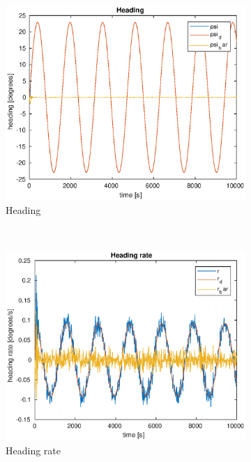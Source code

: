 \begin{figure}[ht]
	\centering
	\begin{subfigure}[b]{0.3\textwidth}
		\includegraphics[width=\textwidth]{heading1_4}
		\caption{Heading}
		\label{fig:heading1_4}
	\end{subfigure}%
	~
	\begin{subfigure}[b]{0.3\textwidth}
		\includegraphics[width=\textwidth]{heading_rate1_4}
		\caption{Heading rate}
		\label{fig:heading_rate1_4}
	\end{subfigure}%
        ~
	\begin{subfigure}[b]{0.3\textwidth}

\end{subfigure}
\end{figure}
